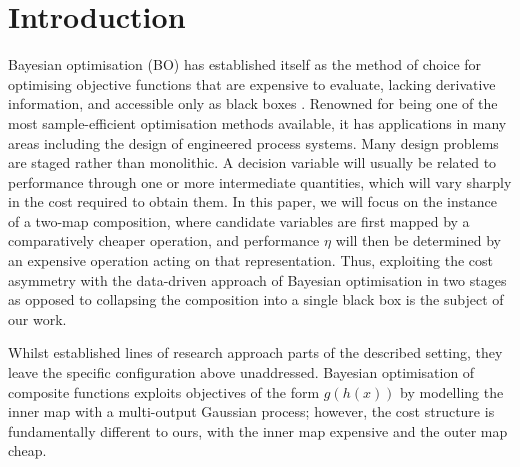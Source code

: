 \documentclass[preprint,12pt]{elsarticle}
\begin{document}


\section{Introduction}
\label{sec1}

Bayesian optimisation (BO) has established itself as the method of choice for optimising objective functions that are expensive to evaluate, lacking derivative information, and accessible only as black boxes \cite{frazier2018tutorial}. Renowned for being one of the most sample-efficient optimisation methods available, it has applications in many areas including the design of engineered process systems. Many design problems are staged rather than monolithic. A decision variable will usually be related to performance through one or more intermediate quantities, which will vary sharply in the cost required to obtain them. In this paper, we will focus on the instance of a two-map composition, where candidate variables are first mapped by a comparatively cheaper operation, and performance $\eta$ will then be determined by an expensive operation acting on that representation. Thus, exploiting the cost asymmetry with the data-driven approach of Bayesian optimisation in two stages as opposed to collapsing the composition into a single black box is the subject of our work.

Whilst established lines of research approach parts of the described setting, they leave the specific configuration above unaddressed. Bayesian optimisation of composite functions \cite{astudillo2019composite} exploits objectives of the form $g(h(x))$ by modelling the inner map with a multi-output Gaussian process; however, the cost structure is fundamentally different to ours, with the inner map expensive and the outer map cheap.
\end{document}
